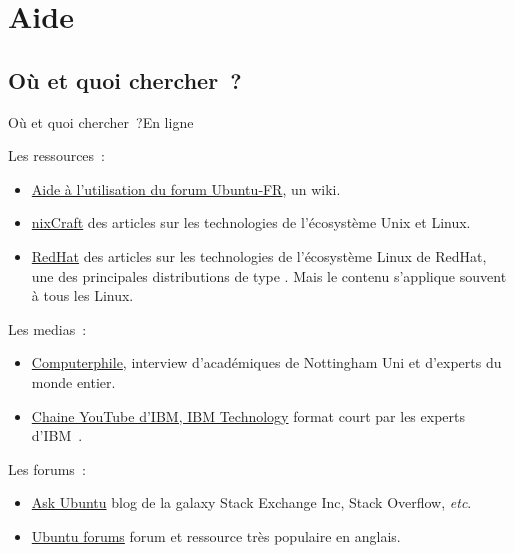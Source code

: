 \documentclass{beamer}
\begin{document}
    \section{Aide}\label{sec:aide}

    \subsection{Où et quoi chercher~?}\label{subsec:aide-ou-quand}

    \begin{frame}{Où et quoi chercher~?}{En ligne}
        \begin{footnotesize}
            Les ressources~:
            \begin{itemize}
                \item \href{https://doc.ubuntu-fr.org/}{Aide à l'utilisation du forum Ubuntu‑FR}, un wiki.
                \item \href{https://www.cyberciti.biz/}{nixCraft} des articles sur les technologies de l'écosystème Unix et Linux.
                \item \href{https://www.redhat.com/}{RedHat} des articles sur les technologies de l'écosystème Linux de RedHat, une des principales distributions de type .
                Mais le contenu s'applique souvent à tous les Linux.
            \end{itemize}
            Les medias~:
            \begin{itemize}
                \item \href{http://www.youtube.com/@Computerphile}{Computerphile}, interview d'académiques de Nottingham Uni et d'experts du monde entier.
                \item \href{http://www.youtube.com/@IBMTechnology}{Chaine YouTube d'IBM, IBM Technology} format court par les experts d'IBM~.
            \end{itemize}
            Les forums~:
            \begin{itemize}
                \item \href{https://askubuntu.com/}{Ask Ubuntu} blog de la galaxy Stack Exchange Inc, Stack Overflow, \textit{etc}.
                \item \href{https://ubuntuforums.org}{Ubuntu forums} forum et ressource très populaire en anglais.
            \end{itemize}
        \end{footnotesize}
    \end{frame}
\end{document}
